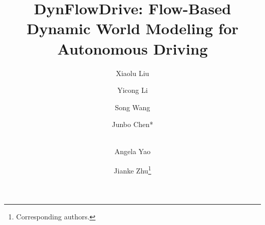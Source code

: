 \documentclass[runningheads]{llncs}
\begin{document}
\title{DynFlowDrive: Flow-Based Dynamic World Modeling for Autonomous Driving} 


\author{Xiaolu Liu \and
Yicong Li\and
Song Wang \and
Junbo Chen* \and \\
Angela Yao \and
Jianke Zhu\thanks{Corresponding authors.}}



\maketitle












\clearpage  %




\end{document}

